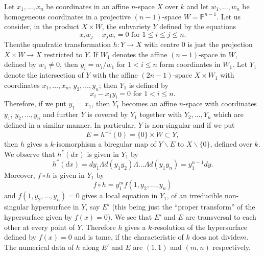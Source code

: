Let $x_{1},\ldots,x_{n}$ be coordinates in an affine $n$-space $X$
over $k$ and let $w_{1},\ldots,w_{n}$ be homogeneous coordinates in a
projective $(n-1)$-space $W=\mathbb{P}^{n-1}$. Let us consider, in
the product $X\times W$, the subvariety $Y$ defined by the equations
$$
x_{i}w_{j}-x_{j}w_{i}=0\text{ \ for \ } 1\leq i\leq j\leq n.
$$
Then\pageoriginale the quadratic transformation $h:Y\to X$ with centre
$0$ is just the projection $X\times W\to X$ restricted to $Y$. If
$W_{1}$ denotes the affine $(n-1)$-space in $W$, defined by $w_{1}\neq
0$, then $y_{i}=w_{i}/w_{1}$ for $1<i\leq n$ form coordinates in
$W_{1}$. Let $Y_{1}$ denote the intersection of $Y$ with the affine
$(2n-1)$-space $X\times W_{1}$ with coordinates $x_{1},\ldots,x_{n}$,
$y_{2},\ldots,y_{n}$; then $Y_{1}$ is defined by 
$$
x_{i}-x_{1}y_{i}=0\text{ \ for \ } 1<i\leq n.
$$
Therefore, if we put $y_{1}=x_{1}$, then $Y_{1}$ becomes an affine
$n$-space with coordinates $y_{1}$, $y_{2},\ldots,y_{n}$ and further
$Y$ is covered by $Y_{1}$ together with $Y_{2},\ldots,Y_{n}$ which are
defined in a similar manner. In particular, $Y$ is non-singular and if
we put 
$$
E=h^{-1}(0)=\{0\}\times W\subset Y,
$$
then $h$ gives a $k$-isomorphism \ie a biregular map of $Y\backslash
E$ to $X\backslash \{0\}$, defined over $k$. We observe that
$h^{\ast}(dx)$ is given in $Y_{1}$ by
$$
h^{\ast}(dx)=dy_{1}\Lambda d(y_{1}y_{2})\Lambda\ldots\Lambda
d(y_{1}y_{n})=y^{n-1}_{1}dy. 
$$
Moreover, $f\circ h$ is given in $Y_{1}$ by
$$
f\circ h=y^{m}_{1}f(1,y_{2},\ldots,y_{n})
$$
and $f(1,y_{2},\ldots,y_{n})=0$ gives a local equation in $Y_{1}$, of
an irreducible non-singular hypersurface in $Y$, say $E'$ (this being
just the ``proper transform'' of the hypersurface given by
$f(x)=0$). We see that $E'$ and $E$ are transversal to each other at
every point of $Y$. Therefore $h$ gives a $k$-resolution of the
hypersurface defined by $f(x)=0$ and is tame, if the characteristic of
$k$ does not divide\pageoriginale $m$. The numerical data of $h$ along
$E'$ and $E$ are $(1,1)$ and $(m,n)$ respectively.

\subsection{}\label{chap3:sec5:subsec2}%

